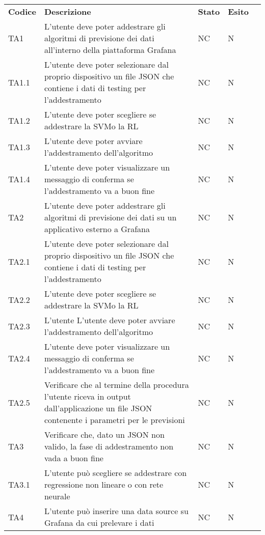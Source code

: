 \begin{longtable} {
		>{\centering}p{15mm} 
		>{\centering}p{79.5mm}
		>{\centering}p{15mm} 
		>{\centering}p{15mm}
		>{}p{0mm}}
	\rowcolor{gray!50}
	\textbf{Codice} & \textbf{Descrizione} & \textbf{Stato} & \textbf{Esito} &\TBstrut \\
	TA1 & L'utente deve poter addestrare gli algoritmi di previsione dei dati all'interno della piattaforma Grafana & NC & N  &\TBstrut \\ [2mm]
	TA1.1 & L'utente deve poter selezionare dal proprio dispositivo un file JSON che contiene i dati di testing per l'addestramento & NC & N  &\TBstrut \\ [2mm]
	TA1.2 & L'utente deve poter scegliere se addestrare la SVM\glosp o la RL\glosp & NC & N  &\TBstrut \\ [2mm]
	TA1.3 & L'utente deve poter avviare l'addestramento dell'algoritmo & NC & N  &\TBstrut \\ [2mm]
	TA1.4 & L'utente deve poter visualizzare un messaggio di conferma se l'addestramento va a buon fine & NC & N  &\TBstrut \\ [2mm]
	TA2 & L'utente deve poter addestrare gli algoritmi di previsione dei dati su un applicativo esterno a Grafana & NC & N  &\TBstrut \\ [2mm]
	TA2.1 & L'utente deve poter selezionare dal proprio dispositivo un file JSON che contiene i dati di testing per l'addestramento & NC & N  &\TBstrut \\ [2mm]
	TA2.2 & L'utente deve poter scegliere se addestrare la SVM\glosp o la RL\glosp & NC & N  &\TBstrut \\ [2mm]
	TA2.3 & L'utente L'utente deve poter avviare l'addestramento dell'algoritmo & NC & N  &\TBstrut \\ [2mm]
	TA2.4 & L'utente deve poter visualizzare un messaggio di conferma se l'addestramento va a buon fine & NC & N  &\TBstrut \\ [2mm]
	TA2.5 & Verificare che al termine della procedura l'utente riceva in output dall'applicazione un file JSON contenente i parametri per le previsioni & NC & N  &\TBstrut \\ [2mm]
	TA3 & Verificare che, dato un JSON non valido, la fase di addestramento non vada a buon fine & NC & N  &\TBstrut \\ [2mm]
	TA3.1 & L'utente può scegliere se addestrare con regressione non lineare o con rete neurale & NC & N  &\TBstrut \\ [2mm]
	TA4 & L'utente può inserire una data source su Grafana da cui prelevare i dati & NC & N  &\TBstrut \\ [2mm]

\end{longtable}
